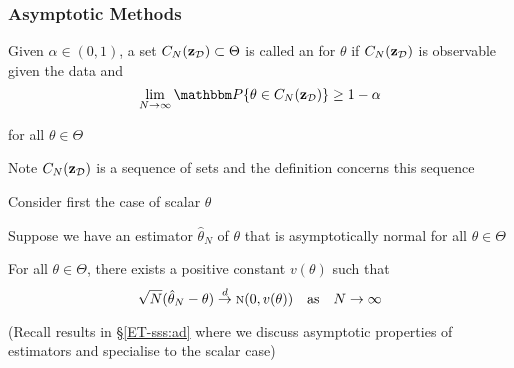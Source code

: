 \begin{frame}\frametitle{Asymptotic Methods}

    \vspace{2em}
    Given $\alpha \in (0,1)$, a set
    $C_N(\mathbf{z}_{\mathcal D}) \subset \Theta$ is called an  for $\theta$ if $C_N(\mathbf{z}_{\mathcal D})$ is observable given
    the data and
    \begin{equation*}
        \label{eq:procia}
        \lim_{N \to \infty} \PP \{ \theta \in C_N(\zdata)  \} \geq 1 - \alpha
    \end{equation*}
    
    for all $\theta \in \Theta$
    
    \vspace{.7em}
    Note $C_N(\mathbf{z}_{\mathcal D})$ is a
    sequence of sets and the definition concerns this sequence
    
\end{frame}

\begin{frame}

    \vspace{2em}
    Consider first the case
    of scalar $\theta$
    
    Suppose we have an estimator $\hat \theta_N$ of $\theta$
    that is asymptotically normal for all $\theta \in \Theta$
    
    \vspace{.7em}
    For all $\theta
    \in \Theta$, there exists a positive constant $v(\theta)$ such that
    \begin{equation}
        \label{eq:asnorm2}
        \sqrt{N} (\hat \theta_N - \theta) \stackrel { d } {\to} \textrm{\sc n}(0, v(\theta)) 
            \quad \text{as} \quad
            N \to \infty
    \end{equation}
    
    (Recall results in  \S\ref{ET-sss:ad} where we discuss asymptotic properties of estimators and specialise to the scalar case)
    
\end{frame}

